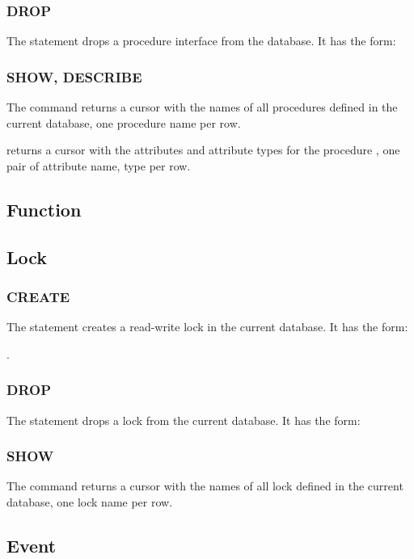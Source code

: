 \subsubsection{DROP}
The  statement
drops a procedure interface from the database.
It has the form:

 

\subsubsection{SHOW, DESCRIBE}
The command 
returns a cursor with the names of all
procedures
defined in the current database,
one procedure name per row.

 
returns a cursor with the attributes
and attribute types for the procedure
, one pair of
attribute name, type per row.

\subsection{Function}

\subsection{Lock}
\subsubsection{CREATE}
The  statement
creates a read-write lock in the current database.
It has the form:

 .

\subsubsection{DROP}
The  statement
drops a lock from the current database.
It has the form:

 

\subsubsection{SHOW}
The command 
returns a cursor with the names of all
lock
defined in the current database,
one lock name per row.

\subsection{Event}

